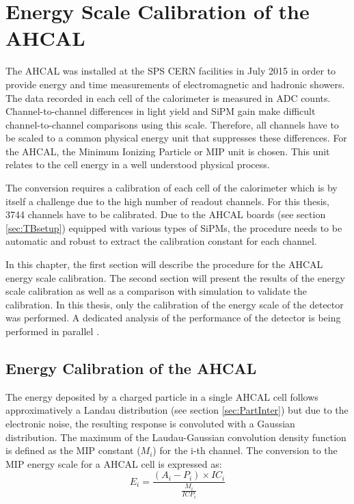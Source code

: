 \chapter{Energy Scale Calibration of the AHCAL}
\label{chap:ECalibAHCAL}

The AHCAL was installed at the SPS CERN facilities in July 2015 in order to provide energy and time measurements of electromagnetic and hadronic showers. The data recorded in each cell of the calorimeter is measured in ADC counts. Channel-to-channel differences in light yield and SiPM gain make difficult channel-to-channel comparisons using this scale. Therefore, all channels have to be scaled to a common physical energy unit that suppresses these differences. For the AHCAL, the Minimum Ionizing Particle or MIP unit is chosen. This unit relates to the cell energy in a well understood physical process.

The conversion requires a calibration of each cell of the calorimeter which is by itself a challenge due to the high number of readout channels. For this thesis, 3744 channels have to be calibrated. Due to the AHCAL boards (see section \ref{sec:TBsetup}) equipped with various types of SiPMs, the procedure needs to be automatic and robust to extract the calibration constant for each channel.

In this chapter, the first section will describe the procedure for the AHCAL energy scale calibration. The second section will present the results of the energy scale calibration as well as a comparison with simulation to validate the calibration. In this thesis, only the calibration of the energy scale of the detector was performed. A dedicated analysis of the performance of the detector is being performed in parallel \cite{AmbraEnergy, AmbraTokyo}.

\section{Energy Calibration of the AHCAL}
\label{sec:EnergyCalibration}

The energy deposited by a charged particle in a single AHCAL cell follows approximatively a Landau distribution (see section \ref{sec:PartInter}) but due to the electronic noise, the resulting response is convoluted with a Gaussian distribution. The maximum of the Laudau-Gaussian convolution density function is defined as the MIP constant ($M_{i}$) for the i-th channel. The conversion to the MIP energy scale for a AHCAL cell is expressed as:
\begin{equation}
	E_i = \frac{(A_i - P_i) \times IC_i }{\frac{M_{i}}{ICP_i}}
\end{equation}

